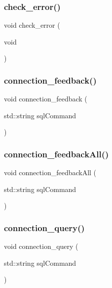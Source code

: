 \subsubsection{check\+\_\+error()}
{\footnotesize\ttfamily void check\+\_\+error (\begin{DoxyParamCaption}\item[{void}]{ }\end{DoxyParamCaption})}

\mbox{\label{connection_8cpp_ab12a404eefae07281e8d1273ca3fc447}} 
\subsubsection{connection\+\_\+feedback()}
{\footnotesize\ttfamily void connection\+\_\+feedback (\begin{DoxyParamCaption}\item[{std\+::string}]{sql\+Command }\end{DoxyParamCaption})}

\mbox{\label{connection_8cpp_a05a069b8d1bef185dd0ff85424e2e13c}} 
\subsubsection{connection\+\_\+feedback\+All()}
{\footnotesize\ttfamily void connection\+\_\+feedback\+All (\begin{DoxyParamCaption}\item[{std\+::string}]{sql\+Command }\end{DoxyParamCaption})}

\mbox{\label{connection_8cpp_af8ead42df91543eb727f4ab7e44e49d5}} 
\subsubsection{connection\+\_\+query()}
{\footnotesize\ttfamily void connection\+\_\+query (\begin{DoxyParamCaption}\item[{std\+::string}]{sql\+Command }\end{DoxyParamCaption})}

